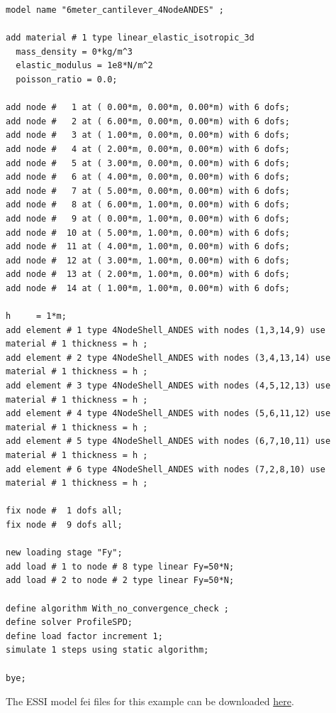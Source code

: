 %
\begin{lstlisting}
model name "6meter_cantilever_4NodeANDES" ;

add material # 1 type linear_elastic_isotropic_3d
  mass_density = 0*kg/m^3
  elastic_modulus = 1e8*N/m^2
  poisson_ratio = 0.0;

add node #   1 at ( 0.00*m, 0.00*m, 0.00*m) with 6 dofs;
add node #   2 at ( 6.00*m, 0.00*m, 0.00*m) with 6 dofs;
add node #   3 at ( 1.00*m, 0.00*m, 0.00*m) with 6 dofs;
add node #   4 at ( 2.00*m, 0.00*m, 0.00*m) with 6 dofs;
add node #   5 at ( 3.00*m, 0.00*m, 0.00*m) with 6 dofs;
add node #   6 at ( 4.00*m, 0.00*m, 0.00*m) with 6 dofs;
add node #   7 at ( 5.00*m, 0.00*m, 0.00*m) with 6 dofs;
add node #   8 at ( 6.00*m, 1.00*m, 0.00*m) with 6 dofs;
add node #   9 at ( 0.00*m, 1.00*m, 0.00*m) with 6 dofs;
add node #  10 at ( 5.00*m, 1.00*m, 0.00*m) with 6 dofs;
add node #  11 at ( 4.00*m, 1.00*m, 0.00*m) with 6 dofs;
add node #  12 at ( 3.00*m, 1.00*m, 0.00*m) with 6 dofs;
add node #  13 at ( 2.00*m, 1.00*m, 0.00*m) with 6 dofs;
add node #  14 at ( 1.00*m, 1.00*m, 0.00*m) with 6 dofs;

h     = 1*m;  
add element # 1 type 4NodeShell_ANDES with nodes (1,3,14,9) use material # 1 thickness = h ; 
add element # 2 type 4NodeShell_ANDES with nodes (3,4,13,14) use material # 1 thickness = h ; 
add element # 3 type 4NodeShell_ANDES with nodes (4,5,12,13) use material # 1 thickness = h ; 
add element # 4 type 4NodeShell_ANDES with nodes (5,6,11,12) use material # 1 thickness = h ; 
add element # 5 type 4NodeShell_ANDES with nodes (6,7,10,11) use material # 1 thickness = h ; 
add element # 6 type 4NodeShell_ANDES with nodes (7,2,8,10) use material # 1 thickness = h ; 

fix node #  1 dofs all;
fix node #  9 dofs all;

new loading stage "Fy";
add load # 1 to node # 8 type linear Fy=50*N;
add load # 2 to node # 2 type linear Fy=50*N;

define algorithm With_no_convergence_check ;
define solver ProfileSPD;
define load factor increment 1;
simulate 1 steps using static algorithm;

bye;
\end{lstlisting}


The ESSI model fei files for this example can be downloaded 
\href{https://github.com/BorisJeremic/Real-ESSI-Examples/blob/master/model_fei_file/ANDESshell_cantilever_inplane/ANDESshell_cantilever_inplane.tgz?raw=true}{here}.








